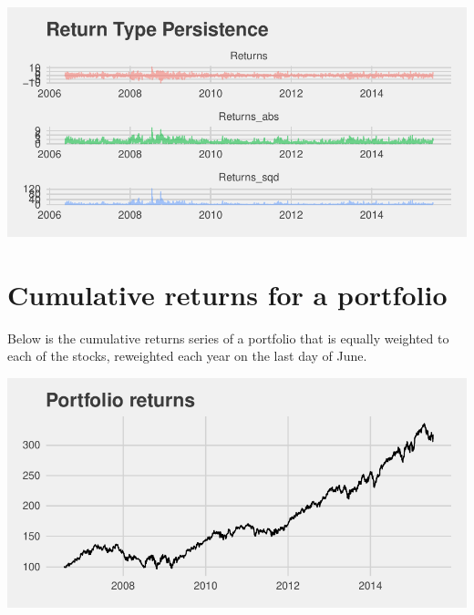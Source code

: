 \documentclass[11pt,preprint, authoryear]{elsarticle}
\let\origfigure\figure
\let\endorigfigure\endfigure
\renewenvironment{figure}[1][2] {
    \expandafter\origfigure\expandafter[H]
} {
    \endorigfigure
}
\numberwithin{equation}{section}
\numberwithin{figure}{section}
\numberwithin{table}{section}
\begin{document}
\begin{figure}[H]
{}

\caption{SBK \label{sbk}}\label{fig:figure7}
\end{figure}\begin{figure}[H]

{\centering \includegraphics{Template_files/figure-latex/figure8-1} 

}

\caption{SLM \label{slm}}\label{fig:figure8}
\end{figure}

\section{Cumulative returns for a
portfolio}\label{cumulative-returns-for-a-portfolio}

Below is the cumulative returns series of a portfolio that is equally
weighted to each of the stocks, reweighted each year on the last day of
June.

\begin{figure}[H]

{\centering \includegraphics{Template_files/figure-latex/figure9-1} 

}

\caption{Portfolio cumulative returns \label{sbk}}\label{fig:figure9}
\end{figure}
\end{document}

